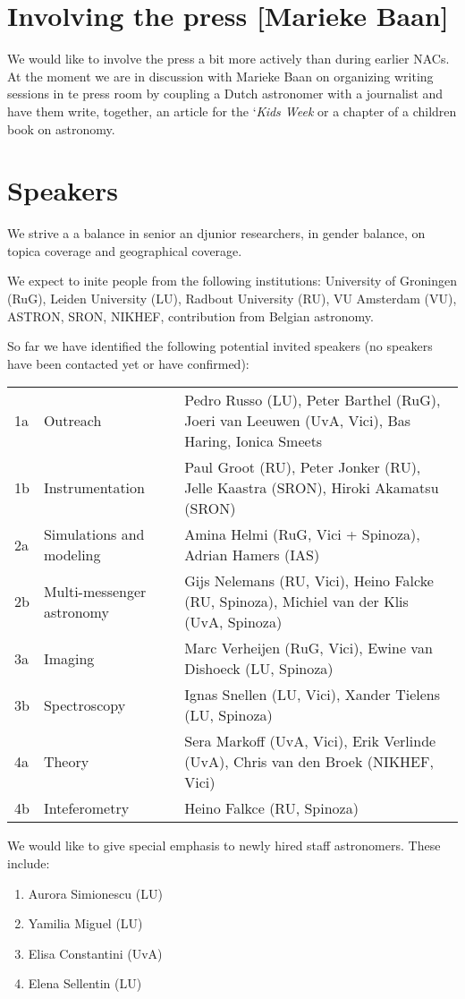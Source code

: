 \documentclass{article}
\begin{document}
\section{Involving the press [Marieke Baan]}

We would like to involve the press a bit more actively than during
earlier NACs.  At the moment we are in discussion with Marieke Baan on
organizing writing sessions in te press room by coupling a Dutch
astronomer with a journalist and have them write, together, an article
for the `{\em Kids Week} or a chapter of a children book on astronomy.

\section{Speakers}

We strive a a balance in senior an djunior researchers, in gender
balance, on topica coverage and geographical coverage.

We expect to inite people from the following institutions: University
of Groningen (RuG), Leiden University (LU), Radbout University (RU),
VU Amsterdam (VU), ASTRON, SRON, NIKHEF, contribution from Belgian
astronomy.

So far we have identified the following potential invited speakers (no
speakers have been contacted yet or have confirmed):

\begin{tabular}{l|l|l}
1a & Outreach                 & Pedro Russo (LU), Peter Barthel (RuG), Joeri van Leeuwen (UvA, Vici), Bas Haring, Ionica Smeets\\
1b & Instrumentation          & Paul Groot (RU), Peter Jonker (RU), Jelle Kaastra (SRON), Hiroki Akamatsu (SRON)\\
2a & Simulations and modeling & Amina Helmi (RuG, Vici + Spinoza), Adrian Hamers (IAS)\\
2b & Multi-messenger astronomy& Gijs Nelemans (RU, Vici), Heino Falcke (RU, Spinoza), Michiel van der Klis (UvA, Spinoza)\\
3a & Imaging                  & Marc Verheijen (RuG, Vici), Ewine van Dishoeck (LU, Spinoza)\\
3b & Spectroscopy             & Ignas Snellen (LU, Vici), Xander Tielens (LU, Spinoza)\\
4a & Theory                   & Sera Markoff (UvA, Vici), Erik Verlinde (UvA), Chris van den Broek (NIKHEF, Vici)\\
4b & Inteferometry            & Heino Falkce (RU, Spinoza)
\end{tabular}

We would like to give special emphasis to newly hired staff astronomers.
These include:
\begin{enumerate}
    \item Aurora Simionescu (LU)
    \item Yamilia Miguel (LU)
    \item Elisa Constantini (UvA)
    \item Elena Sellentin (LU)
\end{enumerate}
\end{document}
